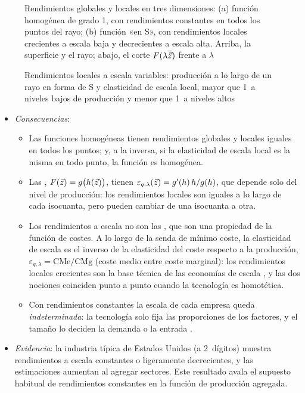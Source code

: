 \documentclass[11pt]{article}
\begin{document}
\begin{figure}[H]
\centering
\caption{Rendimientos globales y locales en tres dimensiones: (a) función homogénea de grado 1, con rendimientos constantes en todos los puntos del rayo; (b) función «en S», con rendimientos locales crecientes a escala baja y decrecientes a escala alta. Arriba, la superficie y el rayo; abajo, el corte $F(\lambda\overline{\vec{z}})$ frente a $\lambda$}\label{fig:rendimientos-globales-locales-3d}
\end{figure}

\begin{figure}[H]
\centering
\caption{Rendimientos locales a escala variables: producción a lo largo de un rayo en forma de S y elasticidad de escala local, mayor que 1~a niveles bajos de producción y menor que 1~a niveles altos}\label{fig:rendimientos-locales}
\end{figure}

\begin{itemize}
\item \emph{Consecuencias}:
  \begin{itemize}
  \item Las funciones homogéneas tienen rendimientos globales y locales iguales en todos los puntos; y, a la inversa, si la elasticidad de escala local es la misma en todo punto, la función es homogénea.
  \item Las , $F(\vec{z})=g\big(h(\vec{z})\big)$, tienen $\varepsilon_{q,\lambda}(\vec{z})=g'(h)\,h/g(h)$, que depende solo del nivel de producción: los rendimientos locales son iguales a lo largo de cada isocuanta, pero pueden cambiar de una isocuanta a otra.
  \item Los rendimientos a escala no son las , que son una propiedad de la función de costes. A lo largo de la senda de mínimo coste, la elasticidad de escala es el inverso de la elasticidad del coste respecto a la producción, $\varepsilon_{q,\lambda}=\mathrm{CMe}/\mathrm{CMg}$ (coste medio entre coste marginal)\nocite{Hanoch1975Elasticity}: los rendimientos locales crecientes son la base técnica de las economías de escala , y las dos nociones coinciden punto a punto cuando la tecnología es homotética.
  \item Con rendimientos constantes la escala de cada empresa queda \emph{indeterminada}: la tecnología solo fija las proporciones de los factores, y el tamaño lo deciden la demanda o la entrada  .
  \end{itemize}
\item \emph{Evidencia}: la industria típica de Estados Unidos (a 2~dígitos) muestra rendimientos a escala constantes o ligeramente decrecientes, y las estimaciones aumentan al agregar sectores\nocite{BasuFernald1997Returns}. Este resultado avala el supuesto habitual de rendimientos constantes en la función de producción agregada.
\end{itemize}
\end{document}
